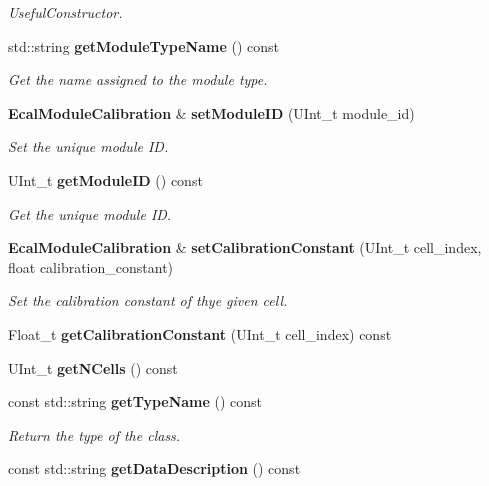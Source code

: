 \begin{DoxyCompactItemize}
\begin{DoxyCompactList}\small\item\em UsefulConstructor. \item\end{DoxyCompactList}\item 
std::string {\bf getModuleTypeName} () const 
\begin{DoxyCompactList}\small\item\em Get the name assigned to the module type. \item\end{DoxyCompactList}\item 
{\bf EcalModuleCalibration} \& {\bf setModuleID} (UInt\_\-t module\_\-id)
\begin{DoxyCompactList}\small\item\em Set the unique module ID. \item\end{DoxyCompactList}\item 
UInt\_\-t {\bf getModuleID} () const 
\begin{DoxyCompactList}\small\item\em Get the unique module ID. \item\end{DoxyCompactList}\item 
{\bf EcalModuleCalibration} \& {\bf setCalibrationConstant} (UInt\_\-t cell\_\-index, float calibration\_\-constant)
\begin{DoxyCompactList}\small\item\em Set the calibration constant of thye given cell. \item\end{DoxyCompactList}\item 
Float\_\-t {\bfseries getCalibrationConstant} (UInt\_\-t cell\_\-index) const \label{classCALICE_1_1EcalModuleCalibration_a4bd0b7b4240be5983283941a0c00995d}

\item 
UInt\_\-t {\bfseries getNCells} () const \label{classCALICE_1_1EcalModuleCalibration_a5547cec59528f2baf4c10a0d918a9c00}

\item 
const std::string {\bf getTypeName} () const \label{classCALICE_1_1EcalModuleCalibration_a433c8e069f2c953af5616d0b0732cb64}

\begin{DoxyCompactList}\small\item\em Return the type of the class. \item\end{DoxyCompactList}\item 
const std::string {\bf getDataDescription} () const \label{classCALICE_1_1EcalModuleCalibration_a661172c0b0e321926e1ff9efb11200ec}


\end{DoxyCompactItemize}
